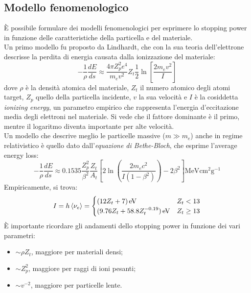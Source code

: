 \subsection{Modello fenomenologico}

È possibile formulare dei modelli fenomenologici per esprimere lo stopping power in funzione delle caratteristiche della particella e del materiale.\\
Un primo modello fu proposto da Lindhardt, che con la sua teoria dell'elettrone descrisse la perdita di energia causata dalla ionizzazione del materiale:
\begin{equation}
	- \frac{1}{\rho} \frac{dE}{ds} \approx \frac{4\pi Z_p^2 e^4}{m_e v^2} Z_t \frac{1}{2} \ln \left[ \frac{2m_e v^2}{I} \right]
	\label{eq:3.4}
\end{equation}
dove $ \rho $ è la densità atomica del materiale, $ Z_t $ il numero atomico degli atomi target, $ Z_p $ quello della particella incidente, $ v $ la sua velocità e $ I $ è la cosiddetta \textit{ionizing energy}, un parametro empirico che rappresenta l'energia d'eccitazione media degli elettroni nel materiale. Si vede che il fattore dominante è il primo, mentre il logaritmo diventa importante per alte velocità.\\
Un modello che descrive meglio le particelle massive ($ m \gg m_e $) anche in regime relativistico è quello dato dall'\textit{equazione di Bethe-Bloch}, che esprime l'average energy loss:
\begin{equation}
	-\frac{1}{\rho} \frac{dE}{ds} \approx 0.1535 \frac{Z_p^2}{\beta^2} \frac{Z_t}{A_t} \left[ 2 \ln \left( \frac{2m_e c^2}{I (1 - \beta^2)} \right) - 2\beta^2 \right] \text{MeV} \text{cm}^2 \text{g}^{-1}
	\label{eq:3.5}
\end{equation}
Empiricamente, si trova:
\begin{equation}
	I = h \braket{\nu_e} =
	\begin{cases}
		(12 Z_t + 7) \,\mathrm{eV} & Z_t < 13 \\
		(9.76 Z_t + 58.8 Z_t^{-0.19}) \,\mathrm{eV} & Z_t \ge 13
	\end{cases}
	\label{eq:3.6}
\end{equation}
È importante ricordare gli andamenti dello stopping power in funzione dei vari parametri:
\begin{itemize}
	\item $ \sim \rho Z_t $, maggiore per materiali densi;
	\item $ \sim Z_p^2 $, maggiore per raggi di ioni pesanti;
	\item $ \sim v^{-2} $, maggiore per particelle lente.
\end{itemize}
